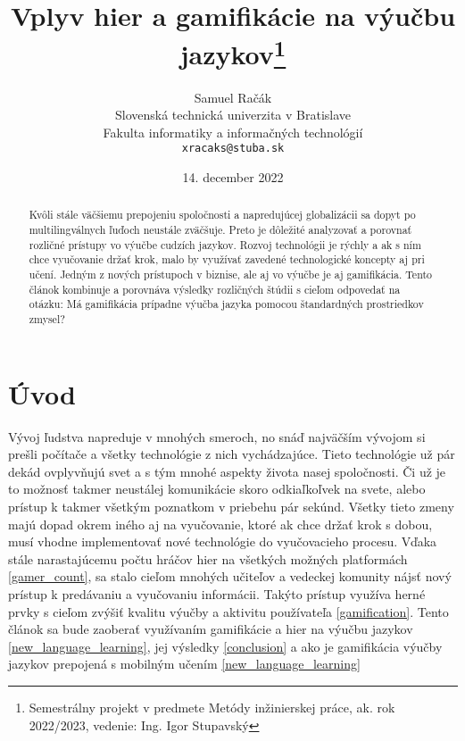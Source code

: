 \documentclass[10pt,slovak,a4paper]{article}
\title{Vplyv hier a gamifikácie na výučbu jazykov\thanks{Semestrálny projekt v predmete Metódy inžinierskej práce, ak. rok 2022/2023, vedenie: Ing. Igor Stupavský}}
\author{Samuel Račák\\[2pt]
	{\small Slovenská technická univerzita v Bratislave}\\
	{\small Fakulta informatiky a informačných technológií}\\
	{\small \texttt{xracaks@stuba.sk}}
	}
\date{\small 14. december 2022} %
\begin{document}
\maketitle

\begin{abstract}
    Kvôli stále väčšiemu prepojeniu spoločnosti a napredujúcej globalizácii sa dopyt po multilingválnych ľuďoch neustále zväčšuje.
    Preto je dôležité analyzovať a porovnať rozličné prístupy vo výučbe cudzích jazykov.
    Rozvoj technológii je rýchly a ak s ním chce vyučovanie držať krok, malo by využívať zavedené technologické koncepty aj pri učení.
    Jedným z nových prístupoch v biznise, ale aj vo výučbe je aj gamifikácia.
    Tento článok kombinuje a porovnáva výsledky rozličných štúdii s cieľom odpovedať na otázku: Má gamifikácia prípadne výučba jazyka pomocou štandardných prostriedkov zmysel?
\end{abstract}
\section{Úvod} \label{Introduction}

Vývoj ľudstva napreduje v mnohých smeroch, no snáď najväčším vývojom si prešli počítače a všetky technológie z nich vychádzajúce.
Tieto technológie už pár dekád ovplyvňujú svet a s tým mnohé aspekty života nasej spoločnosti.
Či už je to možnosť takmer neustálej komunikácie skoro odkiaľkoľvek na svete, alebo prístup k takmer všetkým poznatkom v priebehu pár sekúnd.
Všetky tieto zmeny majú dopad okrem iného aj na vyučovanie, ktoré ak chce držať krok s dobou, musí vhodne implementovať nové technológie do vyučovacieho procesu.
Vďaka stále narastajúcemu počtu hráčov hier na všetkých možných platformách \ref{gamer_count}, sa stalo cieľom mnohých učiteľov a vedeckej komunity nájsť nový prístup k predávaniu a vyučovaniu informácii.
Takýto prístup využíva herné prvky s cieľom zvýšiť kvalitu výučby a aktivitu používateľa \ref{gamification}.
Tento článok sa bude zaoberať využívaním gamifikácie a hier na výučbu jazykov \ref{new_language_learning}, jej výsledky \ref{conclusion} a ako je gamifikácia výučby jazykov prepojená s mobilným učením \ref{new_language_learning}
\end{document}
